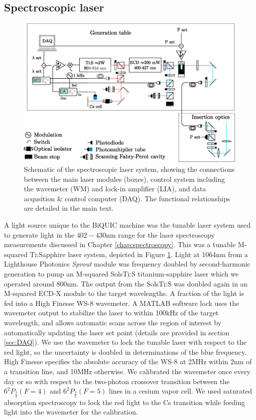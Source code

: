 	
	

\subsection*{Spectroscopic laser}
\label{sec:spec_laser}
	\begin{figure}
		\centering
		\includegraphics[width=\textwidth]{fig/apparatus/solstis_schematic_minim}
		\caption{Schematic of the spectroscopic laser system, showing the connections between the main laser modules (boxes), control system including the wavemeter (WM) and lock-in amplifier (LIA), and data acqusition \& control computer (DAQ). The functional relationships are detailed in the main text.}
		\label{fig:tunable_laser}
	\end{figure}

	A light source unique to the BiQUIC machine was the tunable laser system used to generate light in the $402-430$nm range for the laser spectroscopy measurements discussed  in Chapter \ref{chap:spectroscopy}.
	This  was a tunable M-squared Ti:Sapphire laser system, depicted in Figure \ref{fig:tunable_laser}.
	Light at 1064nm from a Lighthouse Photonics \emph{Sprout} module was frequency doubled by second-harmonic generation to pump an M-squared SolsTi:S titanium-sapphire laser which we operated around 800nm.
	The output from the SolsTi:S was doubled again in an M-squared ECD-X module to the target wavelengths.
	A fraction of the light is fed into a High Finesse WS-8 wavemeter.
	A MATLAB software lock uses the wavemeter output to stabilize the laser to within 100kHz of the target wavelength, and allows automatic scans across the region of interest by automatically updating the laser set point (details are provided in section \ref{sec:DAQ}).
	We use the wavemeter to lock the tunable laser with respect to the red light, so the uncertainty is doubled in determinations of the blue frequency.
	High Finesse specifies the absolute accuracy of the WS-8 at 2MHz within 2nm of a transition line, and 10MHz otherwise.
	We calibrated the wavemeter once every day or so with respect to the two-photon crossover transition between the $6^2P_{\frac{3}{2}} (F=4)$ and $6^2P_{\frac{3}{2}} (F=5)$ lines in a cesium vapor cell.
	We used saturated absorption spectroscopy to lock the red light to the Cs transition while feeding light into the wavemeter for the calibration.	
	



